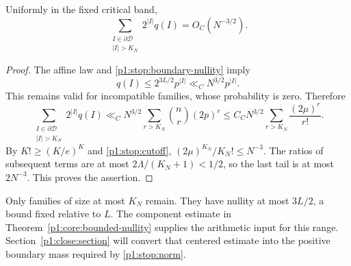 \begin{lemma}
\label{p1:stop:tail}
Uniformly in the fixed critical band,
\begin{equation}
 \sum_{\substack{I\in\partial\mathscr D\\|I|>K_N}}
           2^{|I|}q(I)=O_C(N^{-3/2}).
 \label{p1:stop:tail-bound}
\end{equation}
\end{lemma}

\begin{proof}
The affine law and \eqref{p1:stop:boundary-nullity} imply
\[
 q(I)\le 2^{3L/2}p^{|I|}
          \ll_C N^{3/2}p^{|I|}.
\]
This remains valid for incompatible families, whose probability
is zero.  Therefore
\[
 \sum_{\substack{I\in\partial\mathscr D\\|I|>K_N}}
       2^{|I|}q(I)
 \ll_C N^{3/2}
       \sum_{r>K_N}\binom nr(2p)^r
 \le C_C N^{3/2}
       \sum_{r>K_N}\frac{(2\mu)^r}{r!}.
\]
By $K!\ge(K/e)^K$ and \eqref{p1:stop:cutoff},
$(2\mu)^{K_N}/K_N!\le N^{-3}$.
The ratios of subsequent terms are at most
$2\Lambda/(K_N+1)<1/2$, so the last tail is at most
$2N^{-3}$.  This proves the assertion.
\end{proof}

Only families of size at most $K_N$ remain.  They have nullity
at most $3L/2$, a bound fixed relative to $L$.  The component
estimate in Theorem~\ref{p1:core:bounded-nullity} supplies the
arithmetic input for this range.  Section~\ref{p1:close:section}
will convert that centered estimate into the positive boundary
mass required by \eqref{p1:stop:norm}.
